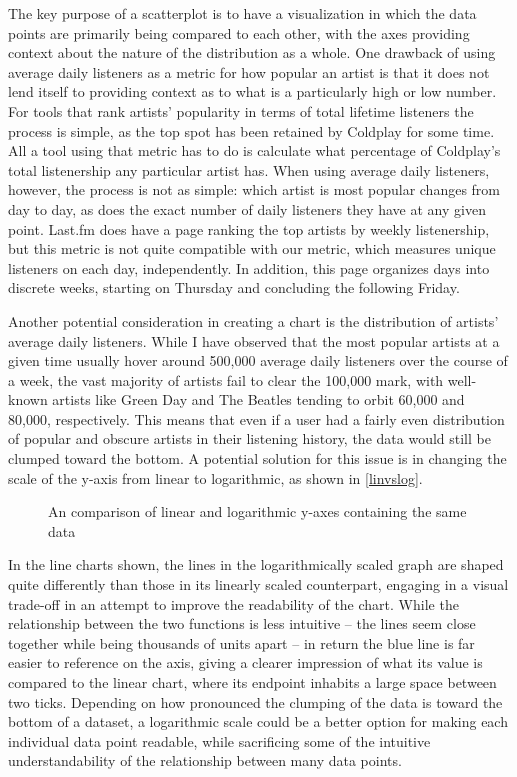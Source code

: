 The key purpose of a scatterplot is to have a visualization in which the data points are primarily being compared to each other, with the axes providing context about the nature of the distribution as a whole. One drawback of using average daily listeners as a metric for how popular an artist is that it does not lend itself to providing context as to what is a particularly high or low number. For tools that rank artists' popularity in terms of total lifetime listeners the process is simple, as the top spot has been retained by Coldplay for some time. All a tool using that metric has to do is calculate what percentage of Coldplay's total listenership any particular artist has. When using average daily listeners, however, the process is not as simple: which artist is most popular changes from day to day, as does the exact number of daily listeners they have at any given point. Last.fm does have a page ranking the top artists by weekly listenership, but this metric is not quite compatible with our metric, which measures unique listeners on each day, independently. In addition, this page organizes days into discrete weeks, starting on Thursday and concluding the following Friday.

Another potential consideration in creating a chart is the distribution of artists' average daily listeners. While I have observed that the most popular artists at a given time usually hover around 500,000 average daily listeners over the course of a week, the vast majority of artists fail to clear the 100,000 mark, with well-known artists like Green Day and The Beatles tending to orbit 60,000 and 80,000, respectively. This means that even if a user had a fairly even distribution of popular and obscure artists in their listening history, the data would still be clumped toward the bottom. A potential solution for this issue is in changing the scale of the y-axis from linear to logarithmic, as shown in \autoref{linvslog}. 

\begin{figure}[!ht]
	\begin{center}
		\caption{An comparison of linear and logarithmic y-axes containing the same data}\label{linvslog}
	\end{center}
\end{figure}

In the line charts shown, the lines in the logarithmically scaled graph are shaped quite differently than those in its linearly scaled counterpart, engaging in a visual trade-off in an attempt to improve the readability of the chart. While the relationship between the two functions is less intuitive -- the lines seem close together while being thousands of units apart -- in return the blue line is far easier to reference on the axis, giving a clearer impression of what its value is compared to the linear chart, where its endpoint inhabits a large space between two ticks. Depending on how pronounced the clumping of the data is toward the bottom of a dataset, a logarithmic scale could be a better option for making each individual data point readable, while sacrificing some of the intuitive understandability of the relationship between many data points.

